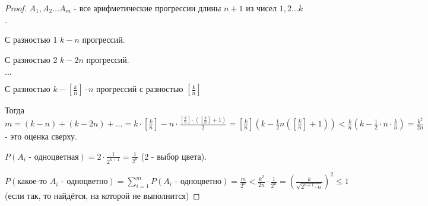 \begin{proof}
    $A_1, A_2 \ldots A_m$ - все арифметические прогрессии длины $n + 1$ из чисел
    $1, 2 \ldots k$. 

    С разностью 1 $k - n$ прогрессий.

    С разностью 2 $k - 2n$ прогрессий.

    $\ldots$

    С разностью $k - [\frac{k}{n}] \cdot n$ прогрессий с разностью $[\frac{k}{n}]$

    Тогда $m = (k - n) + (k - 2n) + \ldots = k \cdot [\frac{k}{n}] - n \cdot \frac{[\frac{k}{n}] \cdot ([\frac{k}{n}] + 1)}{2} = 
    [\frac{k}{n}] (k - \frac{1}{2}n ([\frac{k}{n}] + 1)) < \frac{k}{n} (k - \frac{1}{2} \cdot n \cdot \frac{k}{n}) = \frac{k^2}{2n}$ - это
    оценка сверху.

    $P(\text{$A_i$ - одноцветная}) = 2 \cdot \frac{1}{2^{n + 1}} = \frac{1}{2^n}$ (2 - выбор цвета).

    $P(\text{какое-то $A_i$ - одноцветно}) = \sum_{i = 1}^m P(\text{$A_i$ - одноцветно}) = \frac{m}{2^n} < 
    \frac{k^2}{2n} \cdot \frac{1}{2^n} = (\frac{k}{\sqrt{2^{n + 1} \cdot n}})^2 \leqslant 1$
    (если так, то найдётся, на которой не выполнится)
\end{proof}









